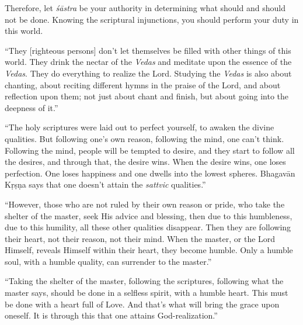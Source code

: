 {Therefore, let \textit{śāstra} be your authority in determining what should and should not be done. Knowing the scriptural injunctions, you should perform your duty in this world.}

\enquote{They [righteous persons] don’t let themselves be filled with other things of this world. They drink the nectar of the \textit{Vedas} and meditate upon the essence of the \textit{Vedas}. They do everything to realize the Lord. Studying the \textit{Vedas} is also about chanting, about reciting different hymns in the praise of the Lord, and about reflection upon them; not just about chant and finish, but about going into the deepness of it.}

\enquote{The holy scriptures were laid out to perfect yourself, to awaken the divine qualities. But following one’s own reason, following the mind, one can’t think. Following the mind, people will be tempted to desire, and they start to follow all the desires, and through that, the desire wins. When the desire wins, one loses perfection. One loses happiness and one dwells into the lowest spheres. Bhagavān Kṛṣṇa says that one doesn’t attain the \textit{sattvic} qualities.}

\enquote{However, those who are not ruled by their own reason or pride, who take the shelter of the master, seek His advice and blessing, then due to this humbleness, due to this humility, all these other qualities disappear. Then they are following their heart, not their reason, not their mind. When the master, or the Lord Himself, reveals Himself within their heart, they become humble. Only a humble soul, with a humble quality, can surrender to the master.}

\enquote{Taking the shelter of the master, following the scriptures, following what the master says, should be done in a selfless spirit, with a humble heart. This must be done with a heart full of Love. And that’s what will bring the grace upon oneself. It is through this that one attains God-realization.}
